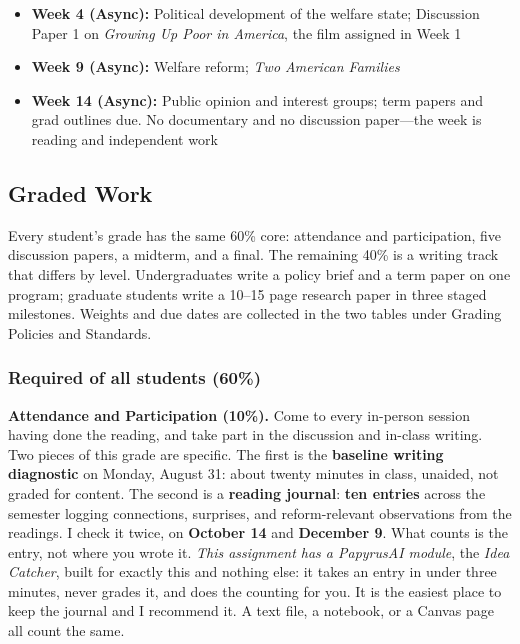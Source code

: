 \documentclass[12pt]{article}
\begin{document}
\begin{itemize}
    \item \textbf{Week 4 (Async):} Political development of the welfare state; Discussion Paper 1 on \emph{Growing Up Poor in America}, the film assigned in Week 1
    \item \textbf{Week 9 (Async):} Welfare reform; \emph{Two American Families}
    \item \textbf{Week 14 (Async):} Public opinion and interest groups; term papers and grad outlines due. No documentary and no discussion paper---the week is reading and independent work
\end{itemize}

\subsection*{Graded Work}
Every student's grade has the same 60\% core: attendance and participation, five discussion papers, a midterm, and a final. The remaining 40\% is a writing track that differs by level. Undergraduates write a policy brief and a term paper on one program; graduate students write a 10--15 page research paper in three staged milestones. Weights and due dates are collected in the two tables under Grading Policies and Standards.

\subsubsection*{Required of all students (60\%)}

\noindent \textbf{Attendance and Participation (10\%).} Come to every in-person session having done the reading, and take part in the discussion and in-class writing. Two pieces of this grade are specific. The first is the \textbf{baseline writing diagnostic} on Monday, August 31: about twenty minutes in class, unaided, not graded for content. The second is a \textbf{reading journal}: \textbf{ten entries} across the semester logging connections, surprises, and reform-relevant observations from the readings. I check it twice, on \textbf{October 14} and \textbf{December 9}. What counts is the entry, not where you wrote it. \emph{This assignment has a PapyrusAI module}, the \emph{Idea Catcher}, built for exactly this and nothing else: it takes an entry in under three minutes, never grades it, and does the counting for you. It is the easiest place to keep the journal and I recommend it. A text file, a notebook, or a Canvas page all count the same.
\end{document}
